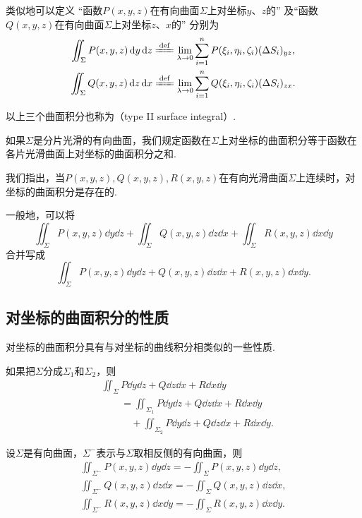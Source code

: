 类似地可以定义
“函数\(P(x,y,z)\)在有向曲面\(\Sigma\)上对坐标\(y\)、\(z\)的”
及“函数\(Q(x,y,z)\)在有向曲面\(\Sigma\)上对坐标\(z\)、\(x\)的”
分别为\begin{gather*}
	\iint_\Sigma P(x,y,z) \dd{y}\dd{z}
	\defeq
	\lim\limits_{\lambda\to0}
	\sum\limits_{i=1}^n P(\xi_i,\eta_i,\zeta_i) (\increment S_i)_{yz}, \\
	\iint_\Sigma Q(x,y,z) \dd{z}\dd{x}
	\defeq
	\lim\limits_{\lambda\to0}
	\sum\limits_{i=1}^n Q(\xi_i,\eta_i,\zeta_i) (\increment S_i)_{zx}.
\end{gather*}

以上三个曲面积分也称为（type II surface integral）.

如果\(\Sigma\)是分片光滑的有向曲面，我们规定函数在\(\Sigma\)上对坐标的曲面积分等于函数在各片光滑曲面上对坐标的曲面积分之和.

我们指出，当\(P(x,y,z),Q(x,y,z),R(x,y,z)\)在有向光滑曲面\(\Sigma\)上连续时，对坐标的曲面积分是存在的.

一般地，可以将\[
\iint_\Sigma P(x,y,z) \dd{y}\dd{z}
+\iint_\Sigma Q(x,y,z) \dd{z}\dd{x}
+\iint_\Sigma R(x,y,z) \dd{x}\dd{y}
\]合并写成\[
\iint_\Sigma{P(x,y,z)\dd{y}\dd{z}+Q(x,y,z)\dd{z}\dd{x}+R(x,y,z)\dd{x}\dd{y}}.
\]

\subsection{对坐标的曲面积分的性质}
对坐标的曲面积分具有与对坐标的曲线积分相类似的一些性质.
\begin{property}
如果把\(\Sigma\)分成\(\Sigma_1\)和\(\Sigma_2\)，则\begin{align*}
&\iint_\Sigma{P\dd{y}\dd{z}+Q\dd{z}\dd{x}+R\dd{x}\dd{y}} \\
&\qquad=\iint_{\Sigma_1}{P\dd{y}\dd{z}+Q\dd{z}\dd{x}+R\dd{x}\dd{y}} \\
&\qquad\quad+\iint_{\Sigma_2}{P\dd{y}\dd{z}+Q\dd{z}\dd{x}+R\dd{x}\dd{y}}.
\end{align*}
\end{property}

\begin{property}
设\(\Sigma\)是有向曲面，\(\Sigma^-\)表示与\(\Sigma\)取相反侧的有向曲面，则\begin{gather*}
\iint_{\Sigma^-} P(x,y,z) \dd{y}\dd{z} = -\iint_\Sigma P(x,y,z) \dd{y}\dd{z}, \\
\iint_{\Sigma^-} Q(x,y,z) \dd{z}\dd{x} = -\iint_\Sigma Q(x,y,z) \dd{z}\dd{x}, \\
\iint_{\Sigma^-} R(x,y,z) \dd{x}\dd{y} = -\iint_\Sigma R(x,y,z) \dd{x}\dd{y}.
\end{gather*}
\end{property}

